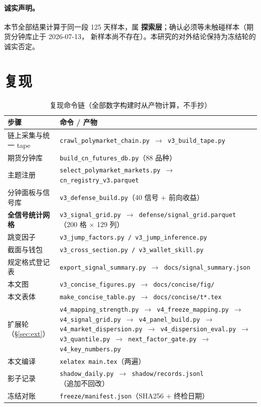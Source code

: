 \documentclass[11pt, a4paper]{ctexart}
\newcommand{\code}[1]{\texttt{\small #1}}
\begin{document}
\paragraph{诚实声明。}本节全部结果计算于同一段 125 天样本，属
\textbf{探索层}；确认必须等未触碰样本（期货分钟库止于 2026-07-13，
新样本尚不存在）。本研究的对外结论保持为冻结轮的诚实否定。

\section{复现}\label{sec:repro}

\begin{table}[h!]\centering\small
\caption{复现命令链（全部数字构建时从产物计算，不手抄）}
\begin{tabular}{p{6.0cm}p{7.4cm}}
\toprule
步骤 & 命令 / 产物 \\
\midrule
链上采集与统一 tape & \code{crawl\_polymarket\_chain.py $\to$
  v3\_build\_tape.py} \\
期货分钟库 & \code{build\_cn\_futures\_db.py}（88 品种） \\
主题注册 & \code{select\_polymarket\_markets.py $\to$
  cn\_registry\_v3.parquet} \\
分钟面板与信号库 & \code{v3\_defense\_build.py}（40 信号 $+$ 前向收益） \\
\textbf{全信号统计网格} & \code{v3\_signal\_grid.py $\to$
  defense/signal\_grid.parquet}（200 格 $\times$ 129 列） \\
跳变因子 & \code{v3\_jump\_factors.py / v3\_jump\_inference.py} \\
截面与钱包 & \code{v3\_cross\_section.py / v3\_wallet\_skill.py} \\
规定格式登记表 & \code{export\_signal\_summary.py $\to$
  docs/signal\_summary.json} \\
本文图 & \code{v3\_concise\_figures.py $\to$ docs/concise/fig/} \\
本文表体 & \code{make\_concise\_table.py $\to$ docs/concise/t*.tex} \\
扩展轮（\S\ref{sec:ext}） & \code{v4\_mapping\_strength.py $\to$
  v4\_freeze\_mapping.py $\to$ v4\_signal\_grid.py $\to$
  v4\_panel\_build.py $\to$ v4\_market\_dispersion.py $\to$
  v4\_dispersion\_eval.py $\to$ v3\_quantile.py $\to$
  next\_factor\_gate.py $\to$ v4\_key\_numbers.py} \\
本文编译 & \code{xelatex main.tex}（两遍） \\
影子记录 & \code{shadow\_daily.py $\to$ shadow/records.jsonl}
  （追加不回改） \\
冻结对账 & \code{freeze/manifest.json}（SHA256 $+$ 终检日期） \\
\bottomrule
\end{tabular}
\end{table}
\end{document}
